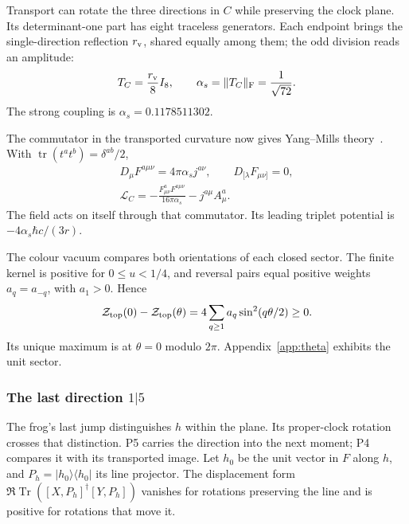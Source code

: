 \documentclass[aps,prx,reprint,longbibliography]{revtex4-2}
\providecommand{\Tr}{\operatorname{Tr}}
\providecommand{\tr}{\operatorname{tr}}
\begin{document}
Transport can rotate the three directions in $C$ while preserving the clock plane. Its determinant-one part has eight traceless generators. Each endpoint brings the single-direction reflection $r_{\rm v}$, shared equally among them; the odd division reads an amplitude:
\begin{equation}
 T_C=\frac{r_{\rm v}}8I_8,\qquad
 \alpha_s=\|T_C\|_{\rm F}=\frac1{\sqrt{72}}.
 \label{eq:strong}
\end{equation}
The strong coupling is $\alpha_s=0.1178511302$.

The commutator in the transported curvature now gives Yang--Mills theory~\cite{YangMills}. With $\tr(t^at^b)=\delta^{ab}/2$,
\begin{equation}
 \begin{gathered}
 D_\mu F^{a\mu\nu}=4\pi\alpha_sj^{a\nu},\qquad
 D_{[\lambda}F_{\mu\nu]}=0,\\
 \mathcal L_C=-\frac{F^a_{\mu\nu}F^{a\mu\nu}}{16\pi\alpha_s}-j^{a\mu}A^a_\mu.
 \end{gathered}
 \label{eq:yang_mills}
\end{equation}
The field acts on itself through that commutator. Its leading triplet potential is $-4\alpha_s\hbar c/(3r)$.

The colour vacuum compares both orientations of each closed sector. The finite kernel is positive for $0\leq u<1/4$, and reversal pairs equal positive weights $a_q=a_{-q}$, with $a_1>0$. Hence
\begin{equation}
 \mathcal Z_{\rm top}(0)-\mathcal Z_{\rm top}(\theta)
 =4\sum_{q\ge1}a_q\sin^2(q\theta/2)\geq0.
 \label{eq:theta}
\end{equation}
Its unique maximum is at $\theta=0$ modulo $2\pi$. Appendix~\ref{app:theta} exhibits the unit sector.

\subsubsection{The last direction \texorpdfstring{$1|5$}{1|5}}
\label{sec:matter}

The frog's last jump distinguishes $h$ within the plane. Its proper-clock rotation crosses that distinction. P5 carries the direction into the next moment; P4 compares it with its transported image. Let $h_0$ be the unit vector in $F$ along $h$, and $P_h=|h_0\rangle\langle h_0|$ its line projector. The displacement form $\Re\Tr([X,P_h]^\dagger[Y,P_h])$ vanishes for rotations preserving the line and is positive for rotations that move it.
\end{document}
